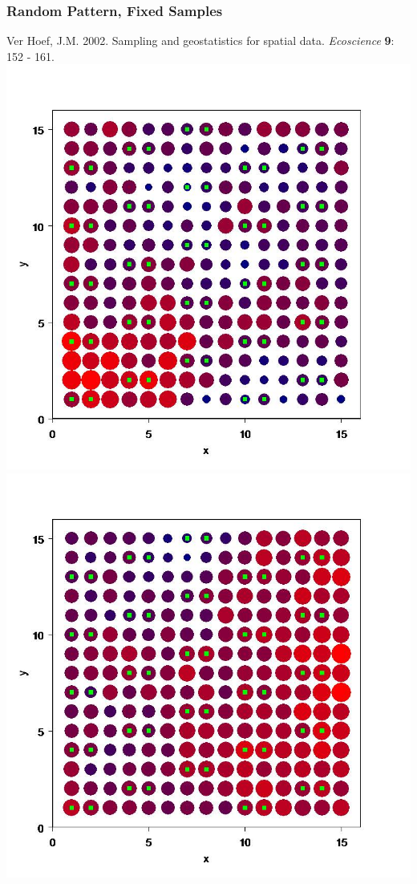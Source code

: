 \documentclass[mathserif,compress]{beamer}\usepackage{graphicx, color}
\makeatletter
\def\maxwidth{ %
  \ifdim\Gin@nat@width>\linewidth
    \linewidth
  \else
    \Gin@nat@width
  \fi
}
\makeatother
\begin{document}
\begin{frame}[fragile]
\frametitle{Random Pattern, Fixed Samples}
\tiny
Ver Hoef, J.M.  2002.  Sampling and geostatistics for spatial data.  {\it Ecoscience} {\bf 9}: 152 - 161.\\
\vspace{.1cm}
	\includegraphics[width=.5\maxwidth]{figure/RandPatFixSamp1.jpg}
	\includegraphics[width=.5\maxwidth]{figure/RandPatFixSamp2.jpg}

\end{frame}
\end{document}
